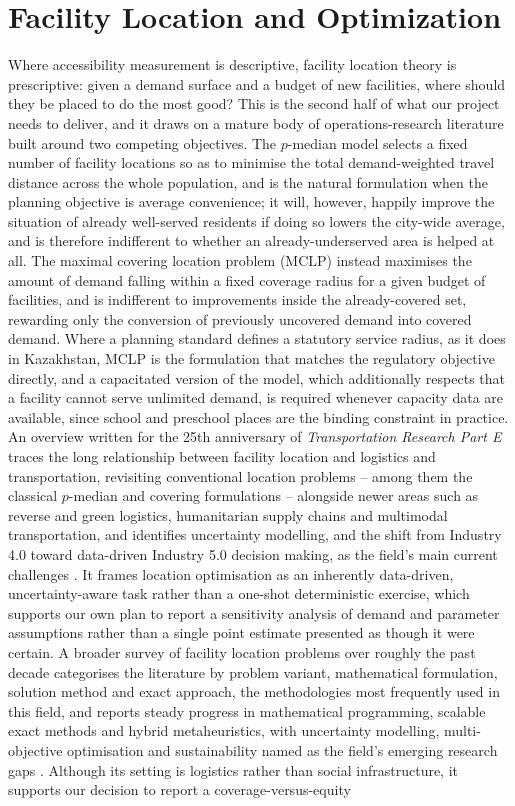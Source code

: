 \documentclass[journal]{IEEEtran}
\begin{document}
\section{Facility Location and Optimization}
\label{sec:location}

Where accessibility measurement is descriptive, facility location theory is prescriptive: given a demand surface and a budget of new facilities, where should they be placed to do the most good? This is the second half of what our project needs to deliver, and it draws on a mature body of operations-research literature built around two competing objectives. The $p$-median model selects a fixed number of facility locations so as to minimise the total demand-weighted travel distance across the whole population, and is the natural formulation when the planning objective is average convenience; it will, however, happily improve the situation of already well-served residents if doing so lowers the city-wide average, and is therefore indifferent to whether an already-underserved area is helped at all. The maximal covering location problem (MCLP) instead maximises the amount of demand falling within a fixed coverage radius for a given budget of facilities, and is indifferent to improvements inside the already-covered set, rewarding only the conversion of previously uncovered demand into covered demand. Where a planning standard defines a statutory service radius, as it does in Kazakhstan, MCLP is the formulation that matches the regulatory objective directly, and a capacitated version of the model, which additionally respects that a facility cannot serve unlimited demand, is required whenever capacity data are available, since school and preschool places are the binding constraint in practice. An overview written for the 25th anniversary of \emph{Transportation Research Part E} traces the long relationship between facility location and logistics and transportation, revisiting conventional location problems -- among them the classical $p$-median and covering formulations -- alongside newer areas such as reverse and green logistics, humanitarian supply chains and multimodal transportation, and identifies uncertainty modelling, and the shift from Industry 4.0 toward data-driven Industry 5.0 decision making, as the field's main current challenges \cite{saldanha2022}. It frames location optimisation as an inherently data-driven, uncertainty-aware task rather than a one-shot deterministic exercise, which supports our own plan to report a sensitivity analysis of demand and parameter assumptions rather than a single point estimate presented as though it were certain. A broader survey of facility location problems over roughly the past decade categorises the literature by problem variant, mathematical formulation, solution method and exact approach, the methodologies most frequently used in this field, and reports steady progress in mathematical programming, scalable exact methods and hybrid metaheuristics, with uncertainty modelling, multi-objective optimisation and sustainability named as the field's emerging research gaps \cite{dissanayake2024}. Although its setting is logistics rather than social infrastructure, it supports our decision to report a coverage-versus-equity 
\end{document}
